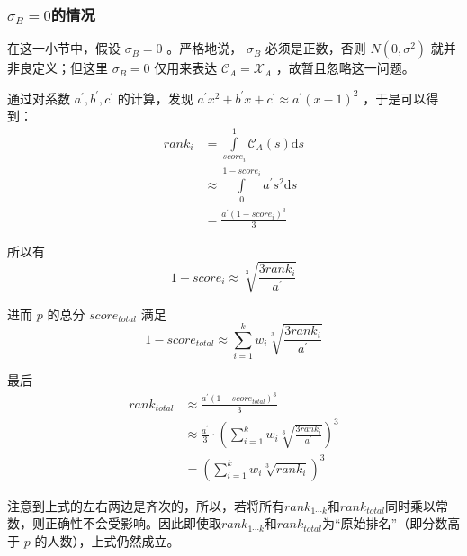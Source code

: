         \subsubsection{$\sigma_B=0$的情况}

            在这一小节中，假设 $\sigma_B=0$ 。严格地说， $\sigma_B$ 必须是正数，否则 $N(0,\sigma^2)$ 就并非良定义；但这里 $\sigma_B=0$ 仅用来表达 $\mathcal{C}_A=\mathcal{X}_A$ ，故暂且忽略这一问题。

            通过对系数 $a^\prime,b^\prime,c^\prime$ 的计算，发现 $a^\prime x^2+b^\prime x+c^\prime\approx a^\prime(x-1)^2$ ，于是可以得到：
            \begin{align*}
                \textit{rank}_i
                &=\int\limits_{\textit{score}_i}^1 \mathcal{C}_A(s) \mathrm{d}s \\
                &\approx\int\limits_0^{1-\textit{score}_i} a^\prime s^2 \mathrm{d}s \\
                &=\frac{a^\prime\left(1-\textit{score}_i\right)^3}3
            \end{align*}

            所以有
            $$
            1-\textit{score}_i\approx\sqrt[3]{\frac{3\textit{rank}_i}{a^\prime}}
            $$

            进而 $p$ 的总分 $\textit{score}_{\textit{total}}$ 满足
            $$
            1-\textit{score}_{\textit{total}}\approx\sum\limits_{i=1}^k w_i\sqrt[3]{\frac{3\textit{rank}_i}{a^\prime}}
            $$

            最后
            \begin{align*}
                \textit{rank}_{\textit{total}}
                &\approx\frac{a^\prime(1-\textit{score}_{\textit{total}})^3}3 \\
                &\approx\frac{a^\prime}{3}\cdot\left(\sum\limits_{i=1}^k w_i\sqrt[3]{\frac{3\textit{rank}_i}{a^\prime}}\right)^3 \\
                &=\left(\sum\limits_{i=1}^k w_i\sqrt[3]{\textit{rank}_i}\right)^3
            \end{align*}

            注意到上式的左右两边是齐次的，所以，若将所有$\textit{rank}_{1\cdots k}$和$\textit{rank}_{\textit{total}}$同时乘以常数，则正确性不会受影响。因此即使取$\textit{rank}_{1\cdots k}$和$\textit{rank}_{\textit{total}}$为“原始排名”（即分数高于 $p$ 的人数），上式仍然成立。
            
            \vspace{1.5ex}

